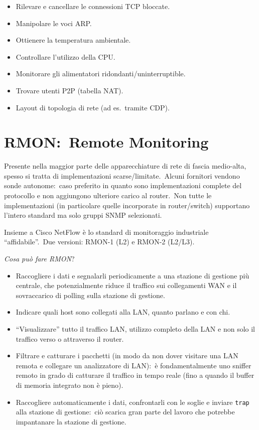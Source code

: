 \begin{itemize}
    \item Rilevare e cancellare le connessioni TCP bloccate.
    \item Manipolare le voci ARP.
    \item Ottienere la temperatura ambientale.
    \item Controllare l'utilizzo della CPU.
    \item Monitorare gli alimentatori ridondanti/uninterruptible.
    \item Trovare utenti P2P (tabella NAT).
    \item Layout di topologia di rete (ad es.\ tramite CDP).
\end{itemize}

\section{RMON:\ Remote Monitoring}

Presente nella maggior parte delle apparecchiature di rete di fascia medio-alta, spesso si tratta di implementazioni scarse/limitate.\
Alcuni fornitori vendono sonde autonome:\ caso preferito in quanto sono implementazioni complete del protocollo e non aggiungono ulteriore carico al router.\
Non tutte le implementazioni (in particolare quelle incorporate in router/switch) supportano l'intero standard ma solo gruppi SNMP selezionati.\

Insieme a Cisco NetFlow è lo standard di monitoraggio industriale ``affidabile''.\
Due versioni: RMON-1 (L2) e RMON-2 (L2/L3).

\begin{center}
    \textit{Cosa può fare RMON}?
\end{center}

\begin{itemize}
    \item Raccogliere i dati e segnalarli periodicamente a una stazione di gestione più centrale, che potenzialmente riduce il traffico sui collegamenti WAN e il sovraccarico di polling sulla stazione di gestione.\
    \item Indicare quali host sono collegati alla LAN, quanto parlano e con chi.
    \item ``Visualizzare'' tutto il traffico LAN, utilizzo completo della LAN e non solo il traffico verso o attraverso il router.
    \item Filtrare e catturare i pacchetti (in modo da non dover visitare una LAN remota e collegare un analizzatore di LAN):\ è fondamentalmente uno sniffer remoto in grado di catturare il traffico in tempo reale (fino a quando il buffer di memoria integrato non è pieno).
    \item Raccogliere automaticamente i dati, confrontarli con le soglie e inviare \texttt{trap} alla stazione di gestione:\ ciò scarica gran parte del lavoro che potrebbe impantanare la stazione di gestione.
\end{itemize}

